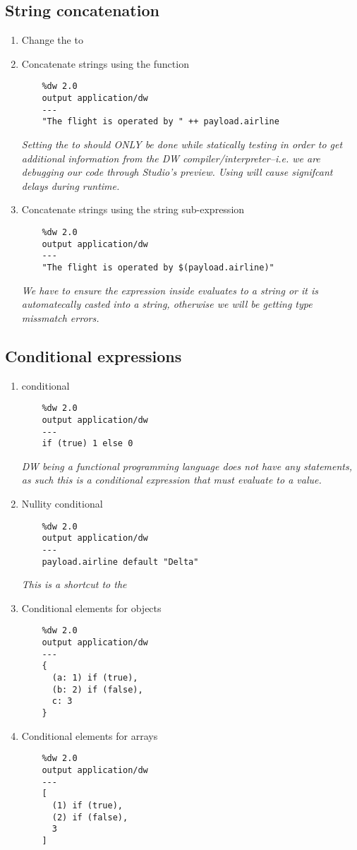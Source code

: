 \subsection{String concatenation}
\begin{enumerate}[resume*]
\item Change the  to 
\item Concatenate strings using the \ttt{++} function
  \begin{lstlisting}
    %dw 2.0
    output application/dw
    ---
    "The flight is operated by " ++ payload.airline
  \end{lstlisting}
  \emph{
    Setting the  to  should ONLY be done while statically testing in order to get additional information from the DW compiler/interpreter--i.e. we are debugging our code through Studio's preview.  Using  will cause signifcant delays during runtime.
  }
\item Concatenate strings using the \ttt{\$()} string sub-expression
  \begin{lstlisting}
    %dw 2.0
    output application/dw
    ---
    "The flight is operated by $(payload.airline)"
  \end{lstlisting}
  \emph{
    We have to ensure the expression inside \ttt{\$()} evaluates to a string or it is automatecally casted into a string, otherwise we will be getting type missmatch errors.
  }
\end{enumerate}

\subsection{Conditional expressions}
\begin{enumerate}[resume*]
\item {} conditional
  \begin{lstlisting}
    %dw 2.0
    output application/dw
    ---
    if (true) 1 else 0
  \end{lstlisting}
  \emph{
    DW being a functional programming language does not have any statements, as such this is a conditional expression that must evaluate to a value.
  }
\item Nullity conditional
  \begin{lstlisting}
    %dw 2.0
    output application/dw
    ---
    payload.airline default "Delta"
  \end{lstlisting}
  \emph{
    This is a shortcut to the 
  }
\item Conditional elements for objects
  \begin{lstlisting}
    %dw 2.0
    output application/dw
    ---
    {
      (a: 1) if (true),
      (b: 2) if (false),
      c: 3
    }
  \end{lstlisting}
\item Conditional elements for arrays
  \begin{lstlisting}
    %dw 2.0
    output application/dw
    ---
    [
      (1) if (true),
      (2) if (false),
      3
    ]
  \end{lstlisting}
\end{enumerate}
